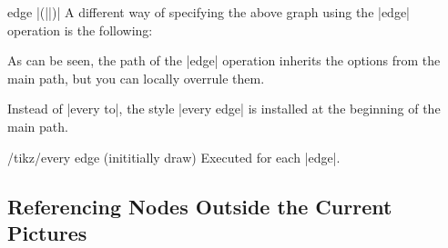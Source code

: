 \begin{pathoperation}{edge}{
     |(||)|}
  A different way of specifying the above graph using the |edge|
  operation is the following:

\begin{codeexample}[]
\end{codeexample}

  As can be seen, the path of the |edge| operation inherits the
  options from the main path, but you can locally overrule them.

\begin{codeexample}[]
\end{codeexample}

  Instead of |every to|, the style |every edge| is installed at the
  beginning of the main path.
  \begin{stylekey}{/tikz/every edge (inititially draw)}                 %
    Executed for each |edge|.
\begin{codeexample}[]
\end{codeexample}
  \end{stylekey}
\end{pathoperation}


\subsection{Referencing Nodes Outside the Current Pictures}

